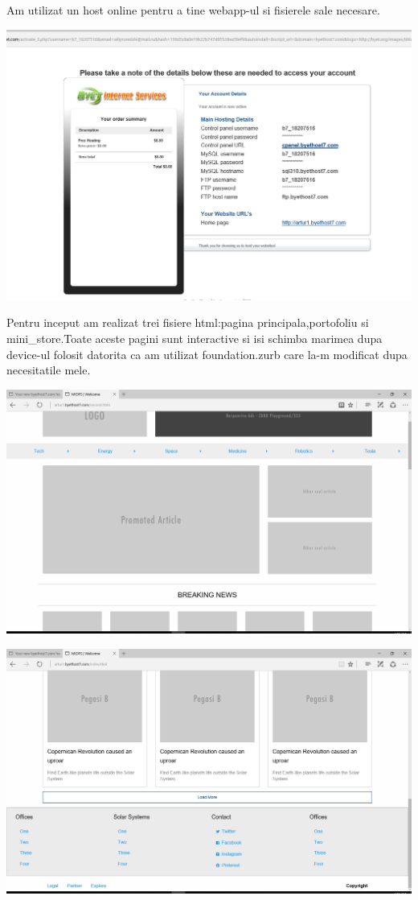 Am utilizat un host online pentru a tine webapp-ul si fisierele sale necesare.
\begin{center}
\includegraphics[scale=0.5]{images/123}
\end{center}
Pentru inceput am realizat trei fisiere html:pagina principala,portofoliu si mini\_store.Toate aceste pagini sunt interactive si isi schimba marimea dupa device-ul folosit datorita ca am utilizat foundation.zurb care la-m modificat dupa necesitatile mele.
\begin{flushleft}
\includegraphics[scale=0.5]{images/1}
\end{flushleft}
\begin{flushleft}
\includegraphics[scale=0.5]{images/2}
\end{flushleft}
